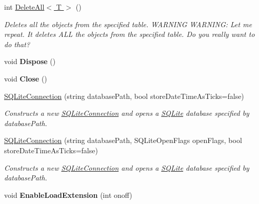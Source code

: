 \begin{DoxyCompactItemize}
int \hyperlink{classSQLite_1_1SQLiteConnection_abed406a2cd17e1e360b79924a749b67c}{Delete\-All$<$ T $>$} ()
\begin{DoxyCompactList}\small\item\em Deletes all the objects from the specified table. W\-A\-R\-N\-I\-N\-G W\-A\-R\-N\-I\-N\-G\-: Let me repeat. It deletes A\-L\-L the objects from the specified table. Do you really want to do that? \end{DoxyCompactList}\item 
\hypertarget{classSQLite_1_1SQLiteConnection_ad9e1e281245e83dbe9c5303eaefe95f6}{void {\bfseries Dispose} ()}\label{classSQLite_1_1SQLiteConnection_ad9e1e281245e83dbe9c5303eaefe95f6}

\item 
\hypertarget{classSQLite_1_1SQLiteConnection_a74160304a4a218b7508220106eeb10d0}{void {\bfseries Close} ()}\label{classSQLite_1_1SQLiteConnection_a74160304a4a218b7508220106eeb10d0}

\item 
\hyperlink{classSQLite_1_1SQLiteConnection_a21204da14d0e2a44039f3395bb4ff12d}{S\-Q\-Lite\-Connection} (string database\-Path, bool store\-Date\-Time\-As\-Ticks=false)
\begin{DoxyCompactList}\small\item\em Constructs a new \hyperlink{classSQLite_1_1SQLiteConnection}{S\-Q\-Lite\-Connection} and opens a \hyperlink{namespaceSQLite}{S\-Q\-Lite} database specified by database\-Path. \end{DoxyCompactList}\item 
\hyperlink{classSQLite_1_1SQLiteConnection_a5d0deb6299d3f479e53cf81899023457}{S\-Q\-Lite\-Connection} (string database\-Path, S\-Q\-Lite\-Open\-Flags open\-Flags, bool store\-Date\-Time\-As\-Ticks=false)
\begin{DoxyCompactList}\small\item\em Constructs a new \hyperlink{classSQLite_1_1SQLiteConnection}{S\-Q\-Lite\-Connection} and opens a \hyperlink{namespaceSQLite}{S\-Q\-Lite} database specified by database\-Path. \end{DoxyCompactList}\item 
\hypertarget{classSQLite_1_1SQLiteConnection_ae9cb05b6c85322d73dd70688182edb01}{void {\bfseries Enable\-Load\-Extension} (int onoff)}\label{classSQLite_1_1SQLiteConnection_ae9cb05b6c85322d73dd70688182edb01}


\end{DoxyCompactItemize}
